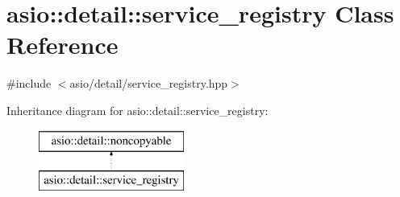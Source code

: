 \hypertarget{classasio_1_1detail_1_1service__registry}{}\section{asio\+:\+:detail\+:\+:service\+\_\+registry Class Reference}
\label{classasio_1_1detail_1_1service__registry}


{\ttfamily \#include $<$asio/detail/service\+\_\+registry.\+hpp$>$}

Inheritance diagram for asio\+:\+:detail\+:\+:service\+\_\+registry\+:\begin{figure}[H]
\begin{center}
\leavevmode
\includegraphics[height=2.000000cm]{classasio_1_1detail_1_1service__registry}
\end{center}
\end{figure}
